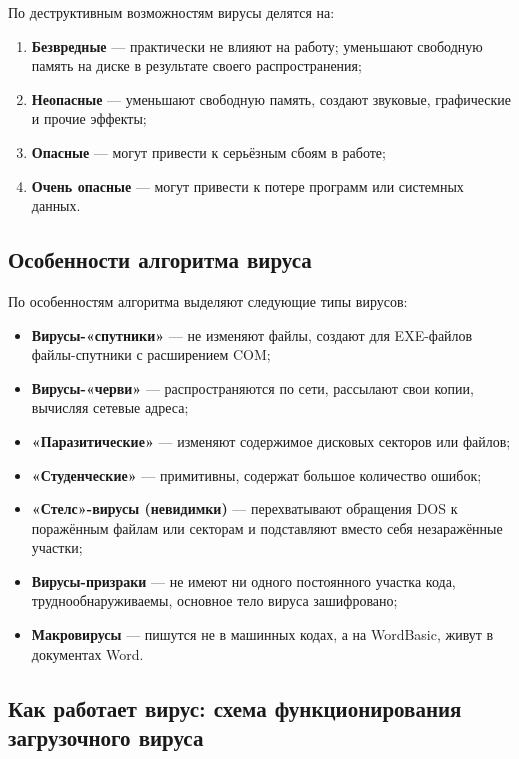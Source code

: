 По деструктивным возможностям вирусы делятся на:
 
\begin{enumerate}
    \item \textbf{Безвредные} — практически не влияют на работу; уменьшают свободную память на диске в результате своего распространения;
    \item \textbf{Неопасные} — уменьшают свободную память, создают звуковые, графические и прочие эффекты;
    \item \textbf{Опасные} — могут привести к серьёзным сбоям в работе;
    \item \textbf{Очень опасные} — могут привести к потере программ или системных данных.
\end{enumerate}
 
\subsection{Особенности алгоритма вируса}
 
По особенностям алгоритма выделяют следующие типы вирусов:
 
\begin{itemize}
    \item \textbf{Вирусы-«спутники»} — не изменяют файлы, создают для EXE-файлов файлы-спутники с расширением COM;
    \item \textbf{Вирусы-«черви»} — распространяются по сети, рассылают свои копии, вычисляя сетевые адреса;
    \item \textbf{«Паразитические»} — изменяют содержимое дисковых секторов или файлов;
    \item \textbf{«Студенческие»} — примитивны, содержат большое количество ошибок;
    \item \textbf{«Стелс»-вирусы (невидимки)} — перехватывают обращения DOS к поражённым файлам или секторам и подставляют вместо себя незаражённые участки;
    \item \textbf{Вирусы-призраки} — не имеют ни одного постоянного участка кода, труднообнаруживаемы, основное тело вируса зашифровано;
    \item \textbf{Макровирусы} — пишутся не в машинных кодах, а на WordBasic, живут в документах Word.
\end{itemize}
 
\subsection{Как работает вирус: схема функционирования загрузочного вируса}
 

